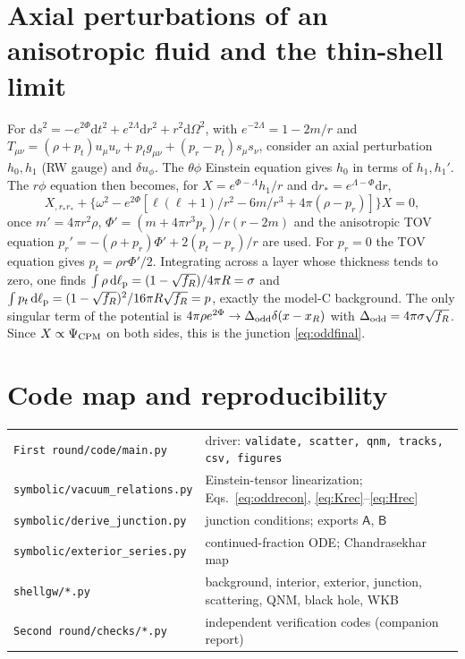 \documentclass[11pt,a4paper]{article}
\numberwithin{equation}{section}
\newcommand{\sq}{\sqrt{f_R}}
\newcommand{\dd}{\mathrm{d}}
\begin{document}
\section{Axial perturbations of an anisotropic fluid and the thin-shell limit}\label{app:axial}
For $\dd s^2=-e^{2\Phi}\dd t^2+e^{2\Lambda}\dd r^2+r^2\dd\Omega^2$, with $e^{-2\Lambda}=1-2m/r$ and
$T_{\mu\nu}=(\rho+p_t)u_\mu u_\nu+p_tg_{\mu\nu}+(p_r-p_t)s_\mu s_\nu$, consider an axial perturbation $h_0,h_1$ (RW
gauge) and $\delta u_\phi$. The $\theta\phi$ Einstein equation gives $h_0$ in terms of $h_1,h_1'$. The $r\phi$
equation then becomes, for $X=e^{\Phi-\Lambda}h_1/r$ and $\dd r_*=e^{\Lambda-\Phi}\dd r$,
\begin{equation}
X_{,r_*r_*}+\big\{\omega^2-e^{2\Phi}[\ell(\ell+1)/r^2-6m/r^3+4\pi(\rho-p_r)]\big\}X=0,
\end{equation}
once $m'=4\pi r^2\rho$, $\Phi'=(m+4\pi r^3p_r)/r(r-2m)$ and the anisotropic TOV equation
$p_r'=-(\rho+p_r)\Phi'+2(p_t-p_r)/r$ are used. For $p_r=0$ the TOV equation gives $p_t=\rho r\Phi'/2$. Integrating
across a layer whose thickness tends to zero, one finds $\int\rho\,\dd\ell_{\rm p}=(1-\sq)/4\pi R=\sigma$ and
$\int p_t\,\dd\ell_{\rm p}=(1-\sq)^2/16\pi R\sq=p$, exactly the model-C background. The only singular term of the
potential is $4\pi\rho e^{2\Phi}\to\Delta_{\rm odd}\delta(x-x_R)$ with $\Delta_{\rm odd}=4\pi\sigma\sq$. Since
$X\propto\Psi_{\rm CPM}$ on both sides, this is the junction \eqref{eq:oddfinal}.

\section{Code map and reproducibility}
\begin{tabular}{p{6.4cm}p{8.6cm}}
\toprule
\texttt{First round/code/main.py} & driver: \texttt{validate, scatter, qnm, tracks, csv, figures}\\
\texttt{symbolic/vacuum\_relations.py} & Einstein-tensor linearization; Eqs.~\eqref{eq:oddrecon}, \eqref{eq:Krec}--\eqref{eq:Hrec}\\
\texttt{symbolic/derive\_junction.py} & junction conditions; exports $\mathsf A$, $\mathsf B$\\
\texttt{symbolic/exterior\_series.py} & continued-fraction ODE; Chandrasekhar map\\
\texttt{shellgw/*.py} & background, interior, exterior, junction, scattering, QNM, black hole, WKB\\
\texttt{Second round/checks/*.py} & independent verification codes (companion report)\\\bottomrule
\end{tabular}
\end{document}
